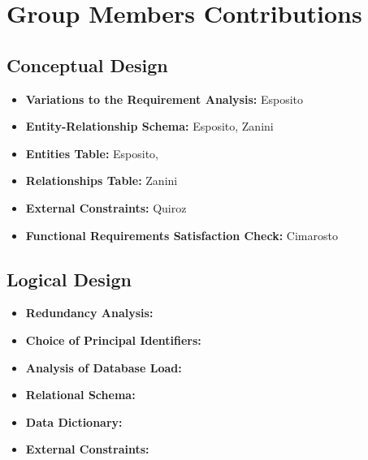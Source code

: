\section{Group Members Contributions}


\subsection{Conceptual Design}
\begin{itemize}
	\item \textbf{Variations to the Requirement Analysis:} Esposito
	\item \textbf{Entity-Relationship Schema:} Esposito, Zanini 
	\item \textbf{Entities Table:} Esposito, 
	\item \textbf{Relationships Table:} Zanini
	\item \textbf{External Constraints:} Quiroz
	\item \textbf{Functional Requirements Satisfaction Check:} Cimarosto
\end{itemize}

\subsection{Logical Design}
\begin{itemize}
	\item \textbf{Redundancy Analysis:} 
	\item \textbf{Choice of Principal Identifiers:}
	\item \textbf{Analysis of Database Load:}
	\item \textbf{Relational Schema:}
	\item \textbf{Data Dictionary:}
	\item \textbf{External Constraints:}
\end{itemize}	